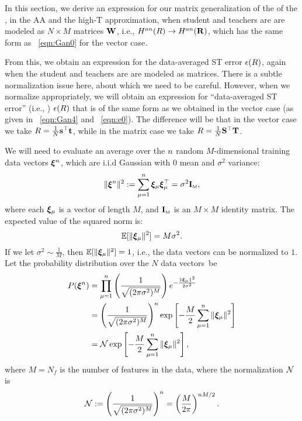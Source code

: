 In this section, we derive an expression for our matrix generalization of the \AnnealedHamiltonian of the \LinearPerceptron,
in the AA and the high-T approximation, when student and teachers are are modeled as $N \times M$ matrices ${\mathbf{W}}$,
i.e., $H^{an}(R)\rightarrow H^{an}(\mathbf{R})$, which has the same form as \EQN~\ref{eqn:Gan0} for the vector case.

From this, we obtain an expression for the data-averaged ST error $\epsilon(R)$, again when the student and teachers are are modeled as matrices.
There is a subtle normalization issue here, about which we need to be careful.
However, when we normalize appropriately, we will obtain an expression
for ``data-averaged ST error'' (i.e., \EffectivePotential) $\epsilon(R)$ that is of the same form as we obtained in the vector case (as given in \EQN~\ref{eqn:Gan4} and \EQN~\ref{eqn:e0}).
%
The difference will be that in the vector case we take $R=\tfrac{1}{N}{\mathbf{s}}^{\top}{\mathbf{t}}$, while in the matrix case we take $R=\tfrac{1}{N}{\mathbf{S}}^{\top}{\mathbf{T}}$.

We will need to evaluate an average over the $n$ random $M$-dimensional training data vectors $\boldsymbol{\xi}^{n}$,
which are i.i.d Gaussian with $0$ mean and $\sigma^{2}$ variance: 
\begin{equation}
  \label{eqn:XInorm}
  \Vert \boldsymbol{\xi}^{n} \Vert^2 :=\sum_{\mu=1}^{n} \boldsymbol{\xi}_\mu \boldsymbol{\xi}_\mu^{\top} = \sigma^{2}\mathbf{I}_{\text{\tiny M}} ,
\end{equation}
where each $\boldsymbol{\xi}_{\mu}$ is a vector of length $M$, and $\mathbf{I}_{\text{\tiny M}}$ is an $M \times M$ identity matrix.
%
The expected value of the squared norm is:
\begin{equation}
\mathbb{E}[\Vert \boldsymbol{\xi}_{\mu} \Vert^2] = M \sigma^2 .
\end{equation}
If we let $\sigma^{2}\sim\tfrac{1}{M}$, 
then $\mathbb{E}[\Vert \boldsymbol{\xi}_{\mu} \Vert^2]=1$, i.e., the data vectors can be normalized to $1$.
%
Let the probability distribution over the $N$ data vectors~be
\begin{align}
\nonumber
  P(\boldsymbol{\xi}^{n}) &= \prod_{\mu=1}^{n} \left( \frac{1}{\sqrt{(2 \pi \sigma^2)^M}} \right) e^{-\frac{\|\boldsymbol{\xi}_{\mu}\|^2}{2 \sigma^2}} \\ 
\nonumber
  &= \left( \frac{1}{\sqrt{(2 \pi \sigma^2)^M}} \right)^{n} \exp\left[-\frac{M}{2}\sum_{\mu=1}^{n}\|\boldsymbol{\xi}_{\mu}\|^2\right] \\ 
  \label{eqn:pndx_vec}
  &= \mathcal{N} \exp\left[-\frac{M}{2}\sum_{\mu=1}^{n}\|\boldsymbol{\xi}_{\mu}\|^2\right] ,
\end{align}
where $M=N_f$ is the number of features in the data, where the normalization $\mathcal{N}$ is
\begin{align}
\label{eqn:xinorm}
\mathcal{N} 
:=\left( \frac{1}{\sqrt{(2 \pi \sigma^2)^M}} \right)^{n}
 =\left( \frac{M}{2\pi} \right)^{n M/2} .
\end{align}

